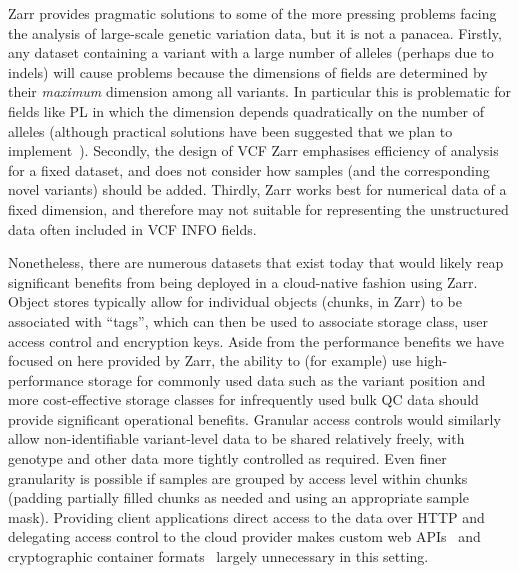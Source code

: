 \documentclass[a4paper,num-refs]{oup-contemporary}
\begin{document}
Zarr provides pragmatic solutions to some of the more pressing 
problems facing the analysis of large-scale genetic variation
data, but it is not a panacea. Firstly, 
any dataset containing a variant with a large number of alleles
(perhaps due to indels) will cause problems because the 
dimensions of fields are determined by their \emph{maximum}
dimension among all variants. In particular this is problematic
for fields like PL in which the dimension depends 
quadratically on the number of alleles (although practical
solutions have been suggested that we plan to 
implement~\cite{poterba2024scalable}).
Secondly, the design of 
VCF Zarr emphasises efficiency of analysis for a fixed 
dataset, and does not consider how samples (and the 
corresponding novel variants) should be added.
Thirdly, Zarr works best for numerical data of a fixed 
dimension, and therefore may not suitable for representing
the unstructured data often included in VCF INFO fields.

Nonetheless, there are numerous datasets that exist today
that would likely reap significant benefits from being deployed 
in a cloud-native fashion using Zarr. Object 
stores typically allow for individual objects (chunks, in
Zarr) to be associated with ``tags'', which can then be 
used to associate storage class, user access control
and encryption keys. 
Aside from the performance benefits
we have focused on here provided by Zarr, the ability
to (for example) use high-performance storage for commonly
used data such as the variant position and 
more cost-effective storage classes
for infrequently used bulk QC data should provide 
significant operational benefits.
Granular access controls would similarly allow non-identifiable
variant-level data to be shared relatively freely,
with genotype and other data more tightly controlled
as required.
Even finer granularity is possible if samples are grouped by
access level within chunks (padding partially filled 
chunks as needed and using an appropriate sample mask). 
Providing client applications direct access to 
the data over HTTP
and delegating access control to the cloud provider
makes custom web APIs~\cite{kelleher2019htsget} 
and cryptographic container formats~\citep{senf2021crypt4gh}
largely unnecessary in this setting.
\end{document}
